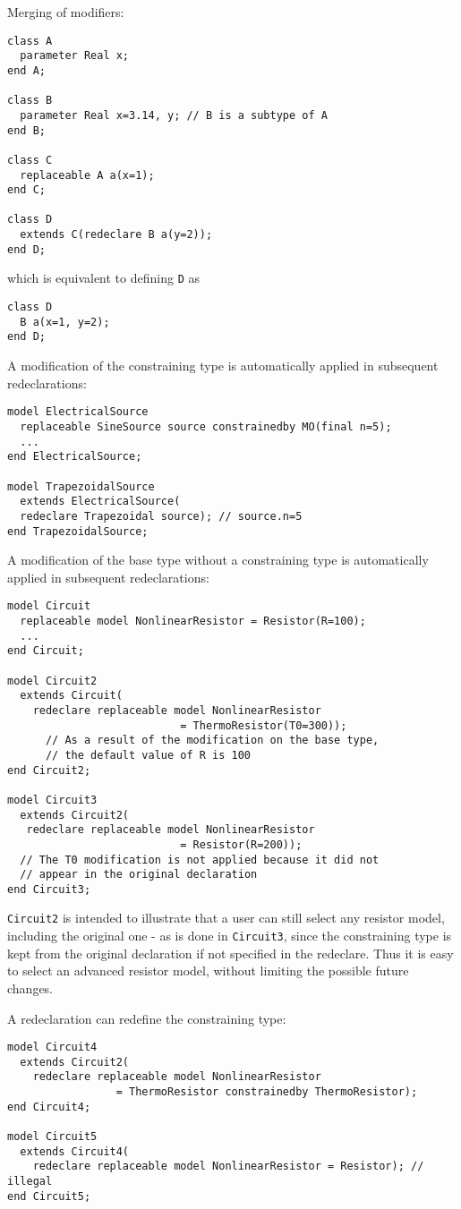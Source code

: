 \begin{example}
Merging of modifiers:
\begin{lstlisting}[language=modelica]
class A
  parameter Real x;
end A;

class B
  parameter Real x=3.14, y; // B is a subtype of A
end B;

class C
  replaceable A a(x=1);
end C;

class D
  extends C(redeclare B a(y=2));
end D;
\end{lstlisting}
which is equivalent to defining \lstinline!D! as
\begin{lstlisting}[language=modelica]
class D
  B a(x=1, y=2);
end D;
\end{lstlisting}

A modification of the constraining type is automatically applied
in subsequent redeclarations:
\begin{lstlisting}[language=modelica]
model ElectricalSource
  replaceable SineSource source constrainedby MO(final n=5);
  ...
end ElectricalSource;

model TrapezoidalSource
  extends ElectricalSource(
  redeclare Trapezoidal source); // source.n=5
end TrapezoidalSource;
\end{lstlisting}

A modification of the base type without a constraining type is
automatically applied in subsequent redeclarations:
\begin{lstlisting}[language=modelica]
model Circuit
  replaceable model NonlinearResistor = Resistor(R=100);
  ...
end Circuit;

model Circuit2
  extends Circuit(
    redeclare replaceable model NonlinearResistor
                           = ThermoResistor(T0=300));
      // As a result of the modification on the base type,
      // the default value of R is 100
end Circuit2;

model Circuit3
  extends Circuit2(
   redeclare replaceable model NonlinearResistor
                           = Resistor(R=200));
  // The T0 modification is not applied because it did not
  // appear in the original declaration
end Circuit3;
\end{lstlisting}

\lstinline!Circuit2! is intended to illustrate that a user can still select
any resistor model, including the original one - as is done in \lstinline!Circuit3!,
since the constraining type is kept from the original declaration if not
specified in the redeclare. Thus it is easy to select an advanced
resistor model, without limiting the possible future changes.

A redeclaration can redefine the constraining type:
\begin{lstlisting}[language=modelica]
model Circuit4
  extends Circuit2(
    redeclare replaceable model NonlinearResistor
                 = ThermoResistor constrainedby ThermoResistor);
end Circuit4;

model Circuit5
  extends Circuit4(
    redeclare replaceable model NonlinearResistor = Resistor); // illegal
end Circuit5;
\end{lstlisting}
\end{example}

